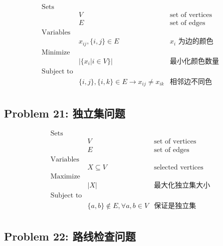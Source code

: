 \documentclass[11pt]{article}
\begin{document}
\begin{eqnarray*}
    \textrm{Sets} \\
        & V & \textrm{set of vertices} \\
        & E & \textrm{set of edges} \\
    \textrm{Variables} \\
        & x_{ij}, \{i, j\} \in E & \textrm{$x_i$ 为边的颜色} \\
    \textrm{Minimize} \\
        & |\{x_i | i \in V\}| & \textrm{最小化颜色数量} \\
    \textrm{Subject to} \\
        & \{i, j\}, \{i, k\} \in E \to x_{ij} \neq x_{ik} & \textrm{相邻边不同色} \\
\end{eqnarray*}



\newpage
\subsection*{Problem 21: 独立集问题}

\begin{eqnarray*}
    \textrm{Sets} \\
        & V & \textrm{set of vertices} \\
        & E & \textrm{set of edges} \\
    \textrm{Variables} \\
        & X \subseteq V & \textrm{selected vertices} \\
    \textrm{Maximize} \\
        & \displaystyle |X| & \textrm{最大化独立集大小} \\
    \textrm{Subject to} \\
        & \{a, b\} \notin E, \forall a, b \in V & \textrm{保证是独立集} \\ 
\end{eqnarray*}


\newpage
\subsection*{Problem 22: 路线检查问题}
\end{document}
